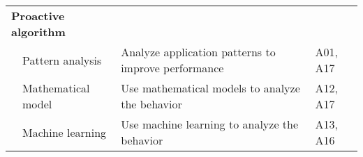 \begin{table*}[p]
\begin{tabular}{llll}
\multicolumn{2}{l}{\textbf{Proactive algorithm}} &  &  \\
 & Pattern analysis & Analyze application patterns to improve performance & A01, A17 \\
 & Mathematical model & Use mathematical models to analyze the behavior & A12, A17 \\
 & Machine learning & Use machine learning to analyze the behavior & A13, A16 \\ \hline
\end{tabular}
\end{table*}